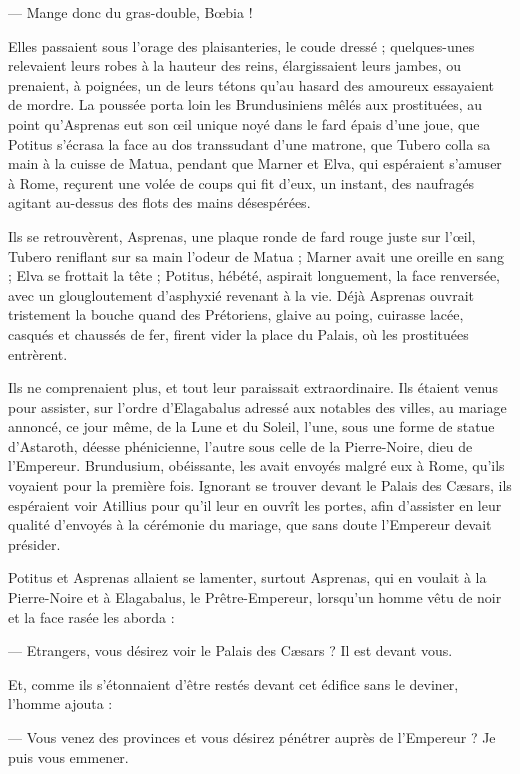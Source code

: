 \documentclass[a4paper, 11pt, oneside, polutonikogreek, french]{article}
\begin{document}
--- Mange donc du gras-double, Bœbia !

Elles passaient sous l'orage des plaisanteries, le coude dressé ; quelques-unes relevaient leurs robes à la hauteur des reins, élargissaient leurs jambes, ou prenaient, à poignées, un de leurs tétons qu'au hasard des amoureux essayaient de mordre. La poussée porta loin les Brundusiniens mêlés aux prostituées, au point qu'Asprenas eut son œil unique noyé dans le fard épais d'une joue, que Potitus s'écrasa la face au dos transsudant d'une matrone, que Tubero colla sa main à la cuisse de Matua, pendant que Marner et Elva, qui espéraient s'amuser à Rome, reçurent une volée de coups qui fit d'eux, un instant, des naufragés agitant au-dessus des flots des mains désespérées.

Ils se retrouvèrent, Asprenas, une plaque ronde de fard rouge juste sur l'œil, Tubero reniflant sur sa main l'odeur de Matua ; Marner avait une oreille en sang ; Elva se frottait la tête ; Potitus, hébété, aspirait longuement, la face renversée, avec un glougloutement d'asphyxié revenant à la vie. Déjà Asprenas ouvrait tristement la bouche quand des Prétoriens, glaive au poing, cuirasse lacée, casqués et chaussés de fer, firent vider la place du Palais, où les prostituées entrèrent.

Ils ne comprenaient plus, et tout leur paraissait extraordinaire. Ils étaient venus pour assister, sur l'ordre d'Elagabalus adressé aux notables des villes, au mariage annoncé, ce jour même, de la Lune et du Soleil, l'une, sous une forme de statue d'Astaroth, déesse phénicienne, l'autre sous celle de la Pierre-Noire, dieu de l'Empereur. Brundusium, obéissante, les avait envoyés malgré eux à Rome, qu'ils voyaient pour la première fois. Ignorant se trouver devant le Palais des Cæsars, ils espéraient voir Atillius pour qu'il leur en ouvrît les portes, afin d'assister en leur qualité d'envoyés à la cérémonie du mariage, que sans doute l'Empereur devait présider.

Potitus et Asprenas allaient se lamenter, surtout Asprenas, qui en voulait à la Pierre-Noire et à Elagabalus, le Prêtre-Empereur, lorsqu'un homme vêtu de noir et la face rasée les aborda :

--- Etrangers, vous désirez voir le Palais des Cæsars ? Il est devant vous.

Et, comme ils s'étonnaient d'être restés devant cet édifice sans le deviner, l'homme ajouta :

--- Vous venez des provinces et vous désirez pénétrer auprès de l’Empereur ? Je puis vous emmener.
\end{document}
